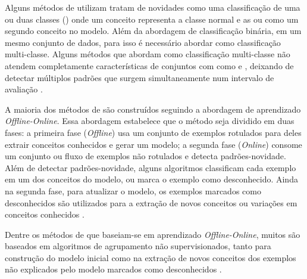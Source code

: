 Alguns métodos de \nd utilizam 
tratam de novidades como uma classificação de uma
ou duas classes () onde um conceito representa a classe normal e
as 
 ou
como um segundo conceito no modelo.
Além da abordagem de classificação binária, 
em um mesmo conjunto de dados, para isso é necessário abordar
\nd como classificação multi-classe.
Alguns métodos que abordam \nd como classificação multi-classe não
atendem completamente características de conjuntos com 
como \evolution e \drift, deixando de detectar múltiplos padrões que surgem
simultaneamente num intervalo de avaliação \cite{Faria2016nd,Gama2010}.

A maioria dos métodos de \nd são construídos seguindo a abordagem de aprendizado
\emph{Offline-Online}. Essa abordagem estabelece que o método seja dividido em
duas fases:
a primeira fase (\emph{Offline}) usa um conjunto de exemplos rotulados para
deles extrair conceitos conhecidos e gerar um modelo;
a segunda fase (\emph{Online}) consome um conjunto ou fluxo de exemplos não
rotulados e detecta padrões-novidade.
Além de detectar padrões-novidade, alguns algoritmos classificam cada exemplo
em um dos conceitos do modelo, ou marca o exemplo como desconhecido.
Ainda na segunda fase, para atualizar o modelo, os exemplos marcados como
desconhecidos são utilizados para a extração de novos conceitos ou variações em
conceitos conhecidos \cite{Gama2010}.

Dentre os métodos de \nd que baseiam-se em aprendizado \emph{Offline-Online},
muitos são baseados em algoritmos de agrupamento não supervisionados, tanto
para construção do modelo inicial como na extração de novos conceitos dos
exemplos não explicados pelo modelo marcados como desconhecidos
\cite{Spinosa2009ollinda,Masud2010ECSMiner,Faria2013}.





